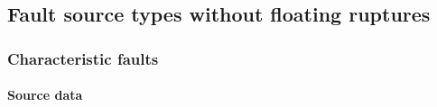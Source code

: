 \subsection{Fault source types without floating ruptures}
\subsubsection{Characteristic faults}

%
\paragraph{Source data}
